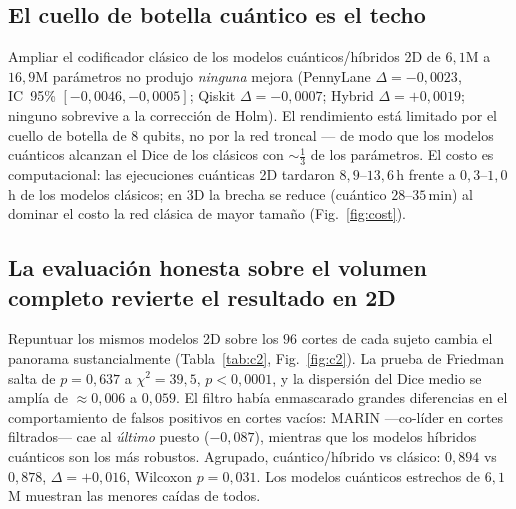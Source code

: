 \documentclass[runningheads]{llncs}
\begin{document}
\subsection{El cuello de botella cuántico es el techo}
Ampliar el codificador clásico de los modelos cuánticos/híbridos 2D de
$6{,}1$M a $16{,}9$M parámetros no produjo \emph{ninguna} mejora
(PennyLane $\Delta{=}{-}0{,}0023$, IC~95\% $[-0{,}0046,-0{,}0005]$;
Qiskit $\Delta{=}{-}0{,}0007$; Hybrid $\Delta{=}{+}0{,}0019$; ninguno sobrevive
a la corrección de Holm). El rendimiento está limitado por el cuello de botella
de $8$ qubits, no por la red troncal --- de modo que los modelos cuánticos
alcanzan el Dice de los clásicos con ${\sim}\tfrac13$ de los parámetros. El
costo es computacional: las ejecuciones cuánticas 2D tardaron $8{,}9$--$13{,}6$\,h
frente a $0{,}3$--$1{,}0$\,h de los modelos clásicos; en 3D la brecha se reduce
(cuántico $28$--$35$\,min) al dominar el costo la red clásica de mayor tamaño
(Fig.~\ref{fig:cost}).

\subsection{La evaluación honesta sobre el volumen completo revierte el
resultado en 2D}
Repuntuar los mismos modelos 2D sobre los $96$ cortes de cada sujeto cambia el
panorama sustancialmente (Tabla~\ref{tab:c2}, Fig.~\ref{fig:c2}). La prueba de
Friedman salta de $p{=}0{,}637$ a $\chi^2{=}39{,}5$, $p{<}0{,}0001$, y la
dispersión del Dice medio se amplía de ${\approx}0{,}006$ a $0{,}059$. El filtro
había enmascarado grandes diferencias en el comportamiento de falsos positivos
en cortes vacíos: MARIN ---co-líder en cortes filtrados--- cae al \emph{último}
puesto ($-0{,}087$), mientras que los modelos híbridos cuánticos son los más
robustos. Agrupado, cuántico/híbrido vs clásico: $0{,}894$ vs $0{,}878$,
$\Delta{=}{+}0{,}016$, Wilcoxon $p{=}0{,}031$. Los modelos cuánticos estrechos de
$6{,}1$M muestran las menores caídas de todos.
\end{document}
